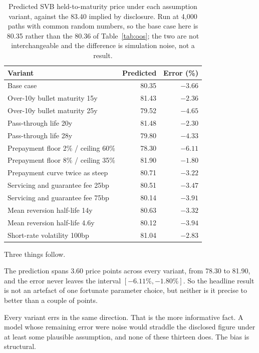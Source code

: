 \begin{table}[htbp]
\centering
\caption{Predicted SVB held-to-maturity price under each assumption variant, against
the 83.40 implied by disclosure. Run at 4,000 paths with common random numbers, so
the base case here is 80.35 rather than the 80.36 of
Table~\ref{tab:oos}; the two are not interchangeable and the difference is
simulation noise, not a result.}
\label{tab:sweep}
\small
\begin{tabular}{lrr}
\toprule
Variant & Predicted & Error (\%) \\
\midrule
Base case & 80.35 & $-3.66$ \\
\addlinespace
Over-10y bullet maturity 15y & 81.43 & $-2.36$ \\
Over-10y bullet maturity 25y & 79.52 & $-4.65$ \\
Pass-through life 20y & 81.48 & $-2.30$ \\
Pass-through life 28y & 79.80 & $-4.33$ \\
Prepayment floor 2\% / ceiling 60\% & 78.30 & $-6.11$ \\
Prepayment floor 8\% / ceiling 35\% & 81.90 & $-1.80$ \\
Prepayment curve twice as steep & 80.71 & $-3.22$ \\
Servicing and guarantee fee 25bp & 80.51 & $-3.47$ \\
Servicing and guarantee fee 75bp & 80.14 & $-3.91$ \\
\addlinespace
Mean reversion half-life 14y & 80.63 & $-3.32$ \\
Mean reversion half-life 4.6y & 80.12 & $-3.94$ \\
Short-rate volatility 100bp & 81.04 & $-2.83$ \\
\bottomrule
\end{tabular}
\end{table}

Three things follow.

The prediction spans 3.60 price points across every variant, from 78.30 to 81.90, and
the error never leaves the interval $[-6.11\%, -1.80\%]$. So the headline result is
not an artefact of one fortunate parameter choice, but neither is it precise to better
than a couple of points.

Every variant errs in the same direction. That is the more informative fact. A model
whose remaining error were noise would straddle the disclosed figure under at least
some plausible assumption, and none of these thirteen does. The bias is structural.

